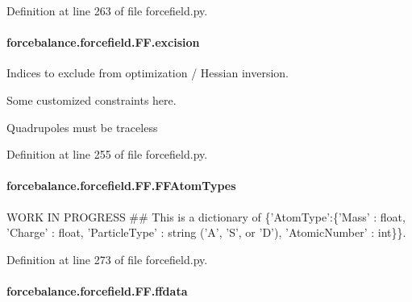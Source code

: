 Definition at line 263 of file forcefield.\-py.

\hypertarget{classforcebalance_1_1forcefield_1_1FF_ad573c583207080fa66592bcbf788cbad}{
\paragraph[{excision}]{\setlength{\rightskip}{0pt plus 5cm}forcebalance.\-forcefield.\-F\-F.\-excision}}\label{classforcebalance_1_1forcefield_1_1FF_ad573c583207080fa66592bcbf788cbad}


Indices to exclude from optimization / Hessian inversion. 

Some customized constraints here.

Quadrupoles must be traceless 

Definition at line 255 of file forcefield.\-py.

\hypertarget{classforcebalance_1_1forcefield_1_1FF_a38e238188fdd105477cd3ad38ca3753b}{
\paragraph[{F\-F\-Atom\-Types}]{\setlength{\rightskip}{0pt plus 5cm}forcebalance.\-forcefield.\-F\-F.\-F\-F\-Atom\-Types}}\label{classforcebalance_1_1forcefield_1_1FF_a38e238188fdd105477cd3ad38ca3753b}


W\-O\-R\-K I\-N P\-R\-O\-G\-R\-E\-S\-S \#\# This is a dictionary of \{'Atom\-Type'\-:\{'Mass' \-: float, 'Charge' \-: float, 'Particle\-Type' \-: string ('A', 'S', or 'D'), 'Atomic\-Number' \-: int\}\}. 



Definition at line 273 of file forcefield.\-py.

\hypertarget{classforcebalance_1_1forcefield_1_1FF_aa33e01455044a76e265e6eafbf9c90d6}{
\paragraph[{ffdata}]{\setlength{\rightskip}{0pt plus 5cm}forcebalance.\-forcefield.\-F\-F.\-ffdata}}\label{classforcebalance_1_1forcefield_1_1FF_aa33e01455044a76e265e6eafbf9c90d6}


